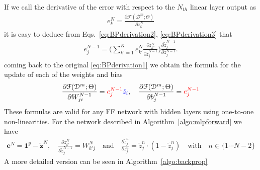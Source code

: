 %
If we call the derivative of the error with respect to the $N_{th}$ linear layer output as
\begin{align}
        e^{N}_k = \frac{\partial \mathcal{F}(\mathcal{D}^m;\Theta)}{\partial z_{k}^{N}}
\label{eq:BPderivation4}
\end{align}
%
\noindent it is easy to deduce from Eqs.~\ref{eq:BPderivation2}, \ref{eq:BPderivation3} that
%
\begin{align}
        e^{N-1}_j = \bigg(\sum_{k'=1}^{K} e^N_{k'} \frac{\partial z_{k'}^{N}}{\partial \tilde{z}_{j}^{N-1}}\bigg)\frac{\partial \tilde{z}_{j}^{N-1}}{\partial z_{j}^{N-1}}.
\label{eq:BPderivation5}
\end{align}
%
\noindent coming back to the original \ref{eq:BPderivation1} we obtain the formula for the update of each of the weights and bias
%
\begin{align}
        \frac{\partial \mathcal{F}(\mathcal{D}^m;\Theta)}{\partial W_{ji}^{N-1}}  = {\color{red} e^{N-1}_j} {\color{blue} \tilde{z}_i},  \quad \frac{\partial \mathcal{F}(\mathcal{D}^m;\Theta)}{\partial b_{j}^{N-1}}  = {\color{red} e^{N-1}_j}
\label{eq:BPderivation6}
\end{align}
%
These formulas are valid for any FF network with hidden layers using one-to-one non-linearities. For the network described in Algorithm~\ref{algo:mlpforward} we have
%
\begin{align}
        \mathbf{e}^{N} =  \mathrm{\mathbf{1}}^{y} - \tilde{\mathbf{z}}^N,
  \quad
        \frac{\partial z_{k'}^N}{\partial \tilde{z}_j^{N-1}} = W_{k'j}^N \quad \mbox{and} \quad
        \frac{\partial \tilde{z}_{j}^n}{\partial z_{j}^n} = \tilde{z}^n_{j}\cdot (1-\tilde{z}^n_{j}) \quad \mbox{with} \quad n \in \{1 \cdots N-2\}
\label{eq:BPderivation7}
\end{align}
%
A more detailed version can be seen in Algorithm~\ref{algo:backprop}
